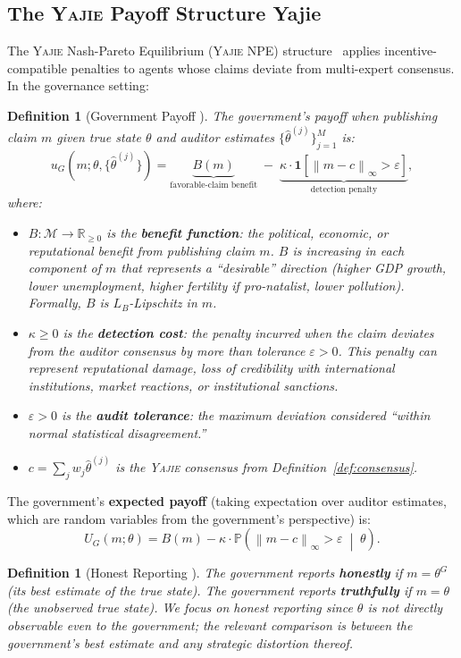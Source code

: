 \documentclass[11pt,a4paper]{article}
\newtheorem{definition}[theorem]{Definition}
\theoremstyle{definition}
\newcommand{\Yajie}{\textsc{Yajie}}
\newcommand{\R}{\mathbb{R}}
\newcommand{\Pbb}{\mathbb{P}}
\newcommand{\ind}[1]{\mathbf{1}[#1]}
\newcommand{\norm}[1]{\left\lVert#1\right\rVert}
\newcommand{\claimSpace}{\mathcal{M}}
\begin{document}
\subsection{The \Yajie{} Payoff Structure Yajie}
The \Yajie{} Nash-Pareto Equilibrium (\Yajie{} NPE) structure~\cite{SCX2025} applies incentive-compatible penalties to agents whose claims deviate from multi-expert consensus. In the governance setting:
\begin{definition}[Government Payoff ]
\label{def:payoff}
The government's payoff when publishing claim $m$ given true state $\theta$ and auditor estimates $\{\hat{\theta}^{(j)}\}_{j=1}^M$ is:
\begin{equation}
    u_G(m; \theta, \{\hat{\theta}^{(j)}\}) = \underbrace{B(m)}_{\text{favorable-claim benefit}} \;-\; \underbrace{\kappa \cdot \ind{\norm{m - c}_\infty > \varepsilon}}_{\text{detection penalty}},
    \label{eq:payoff}
\end{equation}
where:
\begin{itemize}
    \item $B: \claimSpace \to \R_{\geq 0}$ is the \textbf{benefit function}: the political, economic, or reputational benefit from publishing claim $m$. $B$ is increasing in each component of $m$ that represents a ``desirable'' direction (higher GDP growth, lower unemployment, higher fertility if pro-natalist, lower pollution). Formally, $B$ is $L_B$-Lipschitz in $m$.
    \item $\kappa \geq 0$ is the \textbf{detection cost}: the penalty incurred when the claim deviates from the auditor consensus by more than tolerance $\varepsilon > 0$. This penalty can represent reputational damage, loss of credibility with international institutions, market reactions, or institutional sanctions.
    \item $\varepsilon > 0$ is the \textbf{audit tolerance}: the maximum deviation considered ``within normal statistical disagreement.''
    \item $c = \sum_j w_j \hat{\theta}^{(j)}$ is the \Yajie{} consensus from Definition~\ref{def:consensus}.
\end{itemize}
\end{definition}
The government's \textbf{expected payoff} (taking expectation over auditor estimates, which are random variables from the government's perspective) is:
\begin{equation}
    U_G(m; \theta) = B(m) - \kappa \cdot \Pbb\left(\norm{m - c}_\infty > \varepsilon \;\middle|\; \theta\right).
    \label{eq:expected_payoff}
\end{equation}
\begin{definition}[Honest Reporting ]
\label{def:honest}
The government reports \textbf{honestly} if $m = \theta^G$ (its best estimate of the true state). The government reports \textbf{truthfully} if $m = \theta$ (the unobserved true state). We focus on honest reporting since $\theta$ is not directly observable even to the government; the relevant comparison is between the government's best estimate and any strategic distortion thereof.
\end{definition}
\end{document}
